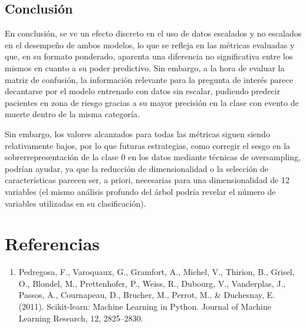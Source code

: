 \documentclass[
  10pt,
]{article}
\providecommand{\tightlist}{%
  \setlength{\itemsep}{0pt}\setlength{\parskip}{0pt}}
\begin{document}
\subsection{Conclusión}\label{conclusiuxf3n}

En conclusión, se ve un efecto discreto en el uso de datos escalados y
no escalados en el desempeño de ambos modelos, lo que se refleja en las
métricas evaluadas y que, en su formato ponderado, aparenta una
diferencia no significativa entre los mismos en cuanto a su poder
predictivo. Sin embargo, a la hora de evaluar la matriz de confusión, la
información relevante para la pregunta de interés parece decantarse por
el modelo entrenado con datos sin escalar, pudiendo predecir pacientes
en zona de riesgo gracias a su mayor precisión en la clase con evento de
muerte dentro de la misma categoría.

Sin embargo, los valores alcanzados para todas las métricas siguen
siendo relativamente bajos, por lo que futuras estrategias, como
corregir el sesgo en la sobrerrepresentación de la clase 0 en los datos
mediante técnicas de oversampling, podrían ayudar, ya que la reducción
de dimensionalidad o la selección de características parecen ser, a
priori, necesarias para una dimensionalidad de 12 variables (el mismo
análisis profundo del árbol podría revelar el número de variables
utilizadas en su clasificación).

\section{Referencias}\label{referencias}

\begin{enumerate}
\def\labelenumi{\arabic{enumi}.}
\tightlist
\item
  Pedregosa, F., Varoquaux, G., Gramfort, A., Michel, V., Thirion, B.,
  Grisel, O., Blondel, M., Prettenhofer, P., Weiss, R., Dubourg, V.,
  Vanderplas, J., Passos, A., Cournapeau, D., Brucher, M., Perrot, M.,
  \& Duchesnay, E. (2011). Scikit-learn: Machine Learning in Python.
  Journal of Machine Learning Research, 12, 2825--2830.
\end{enumerate}
\end{document}
